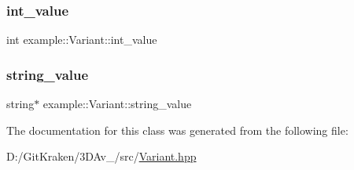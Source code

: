 \subsubsection{\texorpdfstring{int\+\_\+value}{int\_value}}
{\footnotesize\ttfamily int example\+::\+Variant\+::int\+\_\+value}

\mbox{\label{classexample_1_1_variant_ad57fcfdf5afe4006f7fae7f836208542}} 
\subsubsection{\texorpdfstring{string\+\_\+value}{string\_value}}
{\footnotesize\ttfamily string$\ast$ example\+::\+Variant\+::string\+\_\+value}



The documentation for this class was generated from the following file\+:\begin{DoxyCompactItemize}
\item 
D\+:/\+Git\+Kraken/3\+D\+Av\+\_/src/\mbox{\hyperlink{_variant_8hpp}{Variant.\+hpp}}\end{DoxyCompactItemize}
